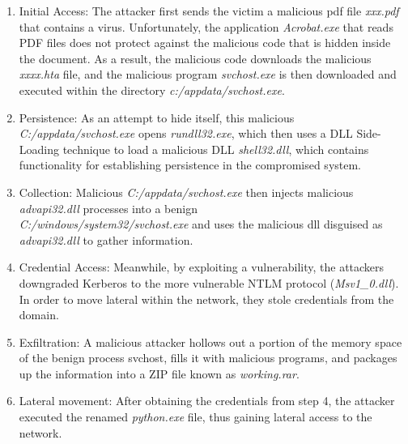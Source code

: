 \begin{enumerate}[leftmargin=*]
    \item Initial Access: The attacker first sends the victim a malicious pdf file \textit{xxx.pdf} that contains a virus. Unfortunately, the application \textit{Acrobat.exe} that reads PDF files does not protect against the malicious code that is hidden inside the document. As a result, the malicious code downloads the malicious \textit{xxxx.hta} file, and the malicious program \textit{svchost.exe} is then downloaded and executed within the directory \textit{c:/appdata/svchost.exe}.
    \item Persistence: As an attempt to hide itself, this malicious \\ \textit{C:/appdata/svchost.exe} opens \textit{rundll32.exe}, which then uses a DLL Side-Loading technique to load a malicious DLL \textit{shell32.dll}, which contains functionality for establishing persistence in the compromised system.
    \item Collection: Malicious \textit{C:/appdata/svchost.exe} then injects malicious \textit{advapi32.dll} processes into a benign \\ \textit{C:/windows/system32/svchost.exe} and uses the malicious dll disguised as \textit{advapi32.dll} to gather information.
    \item Credential Access: Meanwhile, by exploiting a vulnerability, the attackers downgraded Kerberos to the more vulnerable NTLM protocol (\textit{Msv1\_0.dll}). In order to move lateral within the network, they stole credentials from the domain.
    \item Exfiltration: A malicious attacker hollows out a portion of the memory space of the benign process svchost, fills it with malicious programs, and packages up the information into a ZIP file known as \textit{working.rar}.
    \item Lateral movement: After obtaining the credentials from step 4, the attacker executed the renamed \textit{python.exe} file, thus gaining lateral access to the network.
\end{enumerate}




